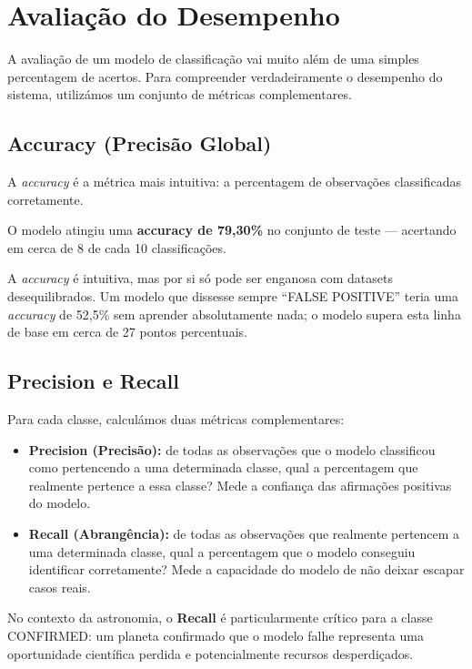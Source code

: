 \documentclass[12pt, a4paper]{report}
\begin{document}
\section{Avaliação do Desempenho}

A avaliação de um modelo de classificação vai muito além de uma simples percentagem de acertos. Para compreender verdadeiramente o desempenho do sistema, utilizámos um conjunto de métricas complementares.

\subsection{Accuracy (Precisão Global)}

A \textit{accuracy} é a métrica mais intuitiva: a percentagem de observações classificadas corretamente.

\begin{caixaresultado}
O modelo atingiu uma \textbf{accuracy de 79,30\%} no conjunto de teste — acertando em cerca de 8 de cada 10 classificações.
\end{caixaresultado}

A \textit{accuracy} é intuitiva, mas por si só pode ser enganosa com datasets desequilibrados. Um modelo que dissesse sempre ``FALSE POSITIVE'' teria uma \textit{accuracy} de 52,5\% sem aprender absolutamente nada; o modelo supera esta linha de base em cerca de 27 pontos percentuais.

\subsection{Precision e Recall}

Para cada classe, calculámos duas métricas complementares:

\begin{itemize}
    \item \textbf{Precision (Precisão):} de todas as observações que o modelo classificou como pertencendo a uma determinada classe, qual a percentagem que realmente pertence a essa classe? Mede a confiança das afirmações positivas do modelo.

    \item \textbf{Recall (Abrangência):} de todas as observações que realmente pertencem a uma determinada classe, qual a percentagem que o modelo conseguiu identificar corretamente? Mede a capacidade do modelo de não deixar escapar casos reais.
\end{itemize}

No contexto da astronomia, o \textbf{Recall} é particularmente crítico para a classe CONFIRMED: um planeta confirmado que o modelo falhe representa uma oportunidade científica perdida e potencialmente recursos desperdiçados.
\end{document}
